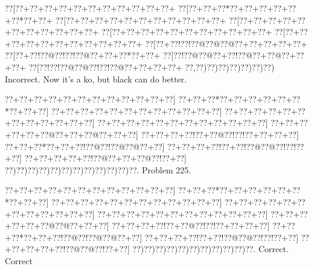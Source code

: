 \documentclass[a5paper]{article}
\begin{document}
\begin{center}
{\goo
\0??[\0??+\0??+\0??+\0??+\0??+\0??+\0??+\0??+\0??+\0??+\0??+
\0??[\0??+\0??+\0??*\0??+\0??+\0??+\0??+\0??+\0??*\0??+\0??+
\0??[\0??+\0??+\0??+\0??+\0??+\0??+\0??+\0??+\0??+\0??+\0??+
\0??[\0??+\0??+\0??+\0??+\0??+\0??+\0??+\0??+\0??+\0??+\0??+
\0??[\0??+\0??+\0??+\0??+\0??+\0??+\0??+\0??+\0??+\0??+\0??+
\0??[\0??+\0??+\0??+\0??+\0??+\0??+\0??+\0??+\0??+\0??+\0??+
\0??[\0??+\0??!\0??!\0??@\0??@\0??@\0??+\0??+\0??+\0??+\0??+
\0??[\0??+\0??!\0??@\0??!\0??!\0??@\0??+\0??+\0??*\0??+\0??+
\0??[\0??!\0??@\0??@\0??+\0??!\0??@\0??+\0??@\0??+\0??+\0??+
\0??[\0??!\0??!\0??@\0??@\0??!\0??!\0??@\0??+\0??+\0??+\0??+
\0??,\0??)\0??)\0??)\0??)\0??)\0??)\0??)
}
Incorrect. Now it's a ko, but black can do better.

\end{center}
\newpage
\begin{center}
{\goo
\0??+\0??+\0??+\0??+\0??+\0??+\0??+\0??+\0??+\0??+\0??+\0??]
\0??+\0??+\0??*\0??+\0??+\0??+\0??+\0??+\0??*\0??+\0??+\0??]
\0??+\0??+\0??+\0??+\0??+\0??+\0??+\0??+\0??+\0??+\0??+\0??]
\0??+\0??+\0??+\0??+\0??+\0??+\0??+\0??+\0??+\0??+\0??+\0??]
\0??+\0??+\0??+\0??+\0??+\0??+\0??+\0??+\0??+\0??+\0??+\0??]
\0??+\0??+\0??+\0??+\0??+\0??@\0??+\0??+\0??@\0??+\0??+\0??]
\0??+\0??+\0??+\0??!\0??+\0??@\0??!\0??!\0??+\0??+\0??+\0??]
\0??+\0??+\0??*\0??+\0??+\0??!\0??@\0??!\0??@\0??@\0??+\0??]
\0??+\0??+\0??+\0??!\0??+\0??!\0??@\0??@\0??!\0??!\0??+\0??]
\0??+\0??+\0??+\0??+\0??!\0??@\0??+\0??+\0??@\0??!\0??+\0??]
\0??)\0??)\0??)\0??)\0??)\0??)\0??)\0??)\0??)\0??)\0??)\0??.
}
Problem 225.

\end{center}
\begin{center}
{\goo
\0??+\0??+\0??+\0??+\0??+\0??+\0??+\0??+\0??+\0??+\0??+\0??]
\0??+\0??+\0??*\0??+\0??+\0??+\0??+\0??+\0??*\0??+\0??+\0??]
\0??+\0??+\0??+\0??+\0??+\0??+\0??+\0??+\0??+\0??+\0??+\0??]
\0??+\0??+\0??+\0??+\0??+\0??+\0??+\0??+\0??+\0??+\0??+\0??]
\0??+\0??+\0??+\0??+\0??+\0??+\0??+\0??+\0??+\0??+\0??+\0??]
\0??+\0??+\0??+\0??+\0??+\0??@\0??@\0??+\0??+\0??]
\0??+\0??+\0??+\0??!\0??+\0??@\0??!\0??!\0??+\0??+\0??+\0??]
\0??+\0??+\0??*\0??+\0??+\0??!\0??@\0??!\0??@\0??@\0??+\0??]
\0??+\0??+\0??+\0??!\0??+\0??!\0??@\0??@\0??!\0??!\0??+\0??]
\0??+\0??+\0??+\0??+\0??!\0??@\0??@\0??!\0??+\0??]
\0??)\0??)\0??)\0??)\0??)\0??)\0??)\0??)\0??)\0??)\0??.
}
Correct. Correct

\end{center}
\end{document}
